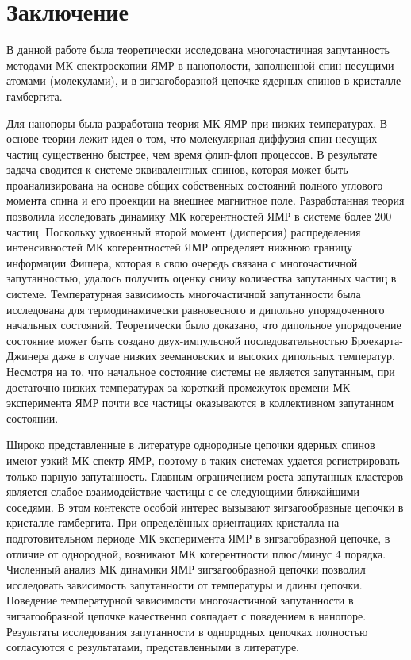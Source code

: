 \chapter*{Заключение}

В данной работе была теоретически исследована многочастичная запутанность методами МК спектроскопии ЯМР в нанополости,
заполненной спин-несущими атомами (молекулами),
и в зигзагоборазной цепочке ядерных спинов в кристалле гамбергита.

Для нанопоры была разработана теория МК ЯМР при низких температурах.
В основе теории лежит идея о том, что молекулярная диффузия спин-несущих частиц существенно быстрее,
чем время флип-флоп процессов.
В результате задача сводится к системе эквивалентных спинов,
которая может быть проанализирована на основе общих собственных состояний полного углового момента спина и его проекции на внешнее магнитное поле.
Разработанная теория позволила исследовать динамику МК когерентностей ЯМР в системе более 200 частиц.
Поскольку удвоенный второй момент (дисперсия) распределения интенсивностей МК когерентностей ЯМР определяет нижнюю границу информации Фишера,
которая в свою очередь связана с многочастичной запутанностью,
удалось получить оценку снизу количества запутанных частиц в системе.
Температурная зависимость многочастичной запутанности была исследована для термодинамически равновесного  и дипольно упорядоченного
начальных состояний.
Теоретически было доказано,
что дипольное упорядочение состояние может быть создано двух-импульсной последовательностью Броекарта-Джинера
даже в случае низких зеемановских и высоких дипольных температур.
Несмотря на то, что начальное состояние системы не является запутанным,
при достаточно низких температурах за короткий промежуток времени МК эксперимента ЯМР почти все частицы оказываются в коллективном запутанном состоянии.

Широко представленные в литературе однородные цепочки ядерных спинов имеют узкий МК спектр ЯМР,
поэтому в таких системах удается регистрировать только парную запутанность.
Главным ограничением роста запутанных кластеров является слабое взаимодействие частицы с ее следующими ближайшими соседями.
В этом контексте особой интерес вызывают зигзагообразные цепочки в кристалле гамбергита.
При определённых ориентациях кристалла на подготовительном периоде МК эксперимента ЯМР в зигзагобразной цепочке,
в отличие от однородной, возникают МК когерентности плюс/минус 4 порядка.
Численный анализ МК динамики ЯМР зигзагообразной цепочки позволил
исследовать зависимость запутанности от температуры и длины цепочки.
Поведение температурной зависимости многочастичной запутанности в зигзагообразной цепочке качественно совпадает с поведением в нанопоре.
Результаты исследования запутанности в однородных цепочках полностью согласуются с результатами, представленными в литературе.

